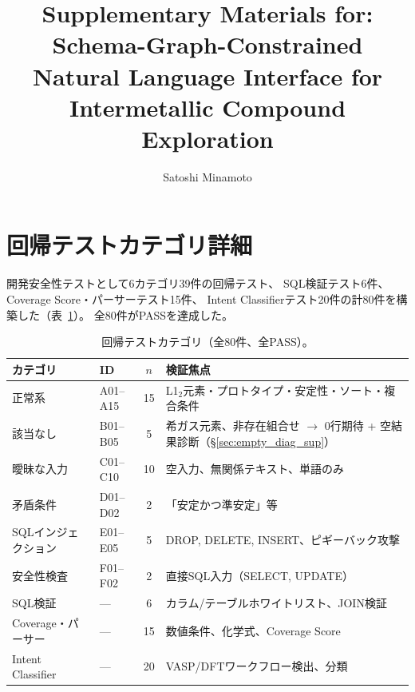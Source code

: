 \documentclass[5p,twocolumn]{elsarticle}
\begin{document}
\begin{frontmatter}

\title{Supplementary Materials for:\\
  Schema-Graph-Constrained Natural Language Interface for\\
  Intermetallic Compound Exploration}

\author[nims]{Satoshi Minamoto}
\address[nims]{National Institute for Materials Science (NIMS),
  1-2-1 Sengen, Tsukuba, Ibaraki 305-0047, Japan}

\end{frontmatter}

\section{回帰テストカテゴリ詳細}
\label{sec:sup_test_categories}

開発安全性テストとして6カテゴリ39件の回帰テスト、
SQL検証テスト6件、Coverage Score・パーサーテスト15件、
Intent Classifierテスト20件の計80件を構築した（表~\ref{tab:test_categories}）。
全80件がPASSを達成した。

\begin{table}[htbp]
\centering
\caption{回帰テストカテゴリ（全80件、全PASS）。}
\label{tab:test_categories}
\small
\begin{tabularx}{\textwidth}{llcX}
  \toprule
  カテゴリ & ID & $n$ & 検証焦点 \\
  \midrule
  正常系 & A01--A15 & 15 & L1$_2$元素・プロトタイプ・安定性・ソート・複合条件 \\
  該当なし & B01--B05 & 5 & 希ガス元素、非存在組合せ $\to$ 0行期待 + 空結果診断（\S\ref{sec:empty_diag_sup}） \\
  曖昧な入力 & C01--C10 & 10 & 空入力、無関係テキスト、単語のみ \\
  矛盾条件 & D01--D02 & 2 & 「安定かつ準安定」等 \\
  SQLインジェクション & E01--E05 & 5 & DROP, DELETE, INSERT、ピギーバック攻撃 \\
  安全性検査 & F01--F02 & 2 & 直接SQL入力（SELECT, UPDATE） \\
  SQL検証 & --- & 6 & カラム/テーブルホワイトリスト、JOIN検証 \\
  Coverage・パーサー & --- & 15 & 数値条件、化学式、Coverage Score \\
  Intent Classifier & --- & 20 & VASP/DFTワークフロー検出、分類 \\
  \bottomrule
\end{tabularx}
\end{table}
\end{document}
